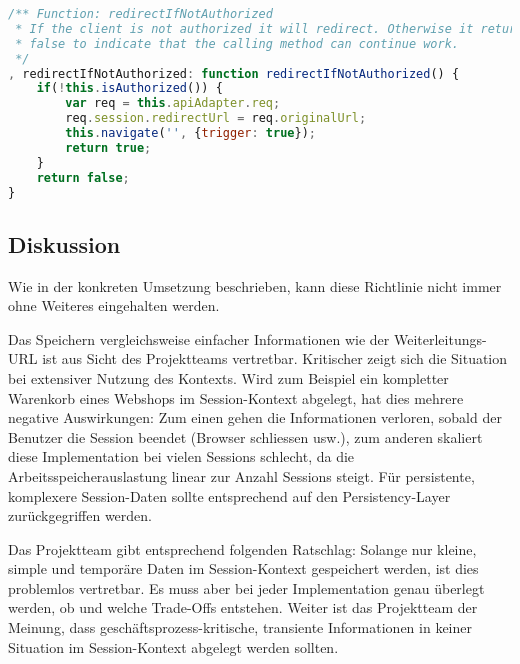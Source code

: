 \begin{lstlisting}[language=JavaScript, caption=Router - Autorisationskontrolle \cite{roomiesRouter}, label=lst:router-set-redirecturl, firstnumber=225]
/** Function: redirectIfNotAuthorized
 * If the client is not authorized it will redirect. Otherwise it returns
 * false to indicate that the calling method can continue work.
 */
, redirectIfNotAuthorized: function redirectIfNotAuthorized() {
	if(!this.isAuthorized()) {
		var req = this.apiAdapter.req;
		req.session.redirectUrl = req.originalUrl;
		this.navigate('', {trigger: true});
		return true;
	}
	return false;
}
\end{lstlisting}


\subsection*{Diskussion}
Wie in der konkreten Umsetzung beschrieben, kann diese Richtlinie nicht immer ohne Weiteres eingehalten werden.

Das Speichern vergleichsweise einfacher Informationen wie der Weiterleitungs-\gls{URL} ist aus Sicht des Projektteams vertretbar. Kritischer zeigt sich die Situation bei extensiver Nutzung des Kontexts. Wird zum Beispiel ein kompletter Warenkorb eines Webshops im Session-Kontext abgelegt, hat dies mehrere negative Auswirkungen: Zum einen gehen die Informationen verloren, sobald der Benutzer die Session beendet (Browser schliessen usw.), zum anderen skaliert diese Implementation bei vielen Sessions schlecht, da die Arbeitsspeicherauslastung linear zur Anzahl Sessions steigt. Für persistente, komplexere Session-Daten sollte entsprechend auf den Persistency-Layer zurückgegriffen werden.

Das Projektteam gibt entsprechend folgenden Ratschlag: Solange nur kleine, simple und temporäre Daten im Session-Kontext gespeichert werden, ist dies problemlos vertretbar. Es muss aber bei jeder Implementation genau überlegt werden, ob und welche Trade-Offs entstehen.
Weiter ist das Projektteam der Meinung, dass geschäftsprozess-kritische, transiente Informationen in keiner Situation im Session-Kontext abgelegt werden sollten.